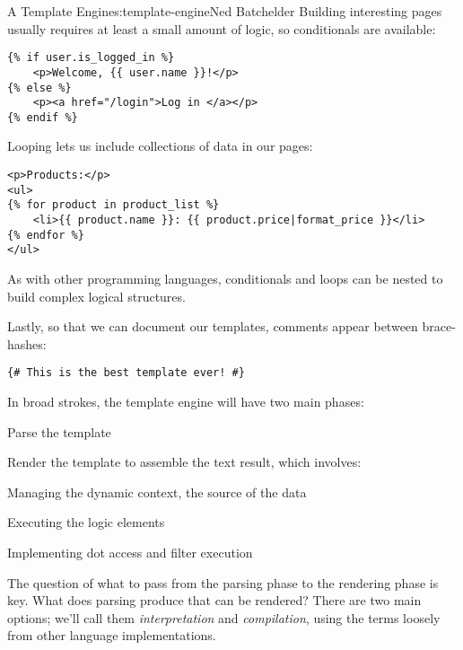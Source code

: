 \begin{aosachapter}{A Template Engine}{s:template-engine}{Ned Batchelder}
Building interesting pages usually requires at least a small amount of
logic, so conditionals are available:

\begin{verbatim}
{% if user.is_logged_in %}
    <p>Welcome, {{ user.name }}!</p>
{% else %}
    <p><a href="/login">Log in </a></p>
{% endif %}
\end{verbatim}

Looping lets us include collections of data in our pages:

\begin{verbatim}
<p>Products:</p>
<ul>
{% for product in product_list %}
    <li>{{ product.name }}: {{ product.price|format_price }}</li>
{% endfor %}
</ul>
\end{verbatim}

As with other programming languages, conditionals and loops can be
nested to build complex logical structures.

Lastly, so that we can document our templates, comments appear between
brace-hashes:

\begin{verbatim}
{# This is the best template ever! #}
\end{verbatim}

\label{implementation-approaches}

In broad strokes, the template engine will have two main phases:

\begin{aosaitemize}

\item
  Parse the template
\item
  Render the template to assemble the text result, which involves:

  \begin{aosaitemize}
  
  \item
    Managing the dynamic context, the source of the data
  \item
    Executing the logic elements
  \item
    Implementing dot access and filter execution
  \end{aosaitemize}
\end{aosaitemize}

The question of what to pass from the parsing phase to the rendering
phase is key. What does parsing produce that can be rendered? There are
two main options; we'll call them \emph{interpretation} and
\emph{compilation}, using the terms loosely from other language
implementations.


\end{aosachapter}
